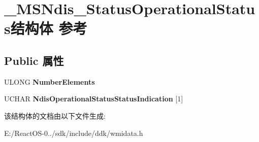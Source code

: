 \hypertarget{struct___m_s_ndis___status_operational_status}{}\section{\+\_\+\+M\+S\+Ndis\+\_\+\+Status\+Operational\+Status结构体 参考}
\label{struct___m_s_ndis___status_operational_status}
\subsection*{Public 属性}
\begin{DoxyCompactItemize}
\item 
\mbox{\label{struct___m_s_ndis___status_operational_status_a4cfc7f0e5f626dc94d8d25613399c2bb}} 
U\+L\+O\+NG {\bfseries Number\+Elements}
\item 
\mbox{\label{struct___m_s_ndis___status_operational_status_a4cedfc45d9725ac66c271f85b4f8168f}} 
U\+C\+H\+AR {\bfseries Ndis\+Operational\+Status\+Status\+Indication} \mbox{[}1\mbox{]}
\end{DoxyCompactItemize}


该结构体的文档由以下文件生成\+:\begin{DoxyCompactItemize}
\item 
E\+:/\+React\+O\+S-\/0../sdk/include/ddk/wmidata.\+h\end{DoxyCompactItemize}
